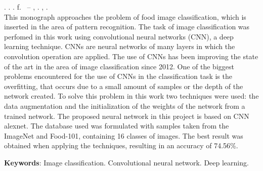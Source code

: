 
\begin{resumo}[ABSTRACT]
\begin{SingleSpacing}

\imprimirautorcitacao. \imprimirtitleabstract. \imprimirdata. \pageref {LastPage} f. \imprimirprojeto\ – \imprimirprograma, \imprimirinstituicao. \imprimirlocal, \imprimirdata.\\


This monograph approaches the problem of food image classification, which is inserted in the area of pattern recognition. The task of image classification was perfomed in this work using convolutional neural networks (CNN), a deep learning technique. CNNs are neural networks of many layers in which the convolution operation are applied. The use of CNNs has been improving the state of the art in the area of image classification since 2012. One of the biggest problems encountered for the use of CNNs in the classification task is the overfitting, that occurs due to a small amount of samples or the depth of the network created. To solve this problem in this work two techniques were used: the data augmentation and the initialization of the weights of the network from a trained network. The proposed neural network in this project is based on CNN alexnet. The database used was formulated with samples taken from the ImageNet and Food-101, containing 16 classes of images. The best result was obtained when applying the techniques, resulting in an accuracy of 74.56\%.

\textbf{Keywords}: Image classification. Convolutional neural network. Deep learning.

\end{SingleSpacing}
\end{resumo}

